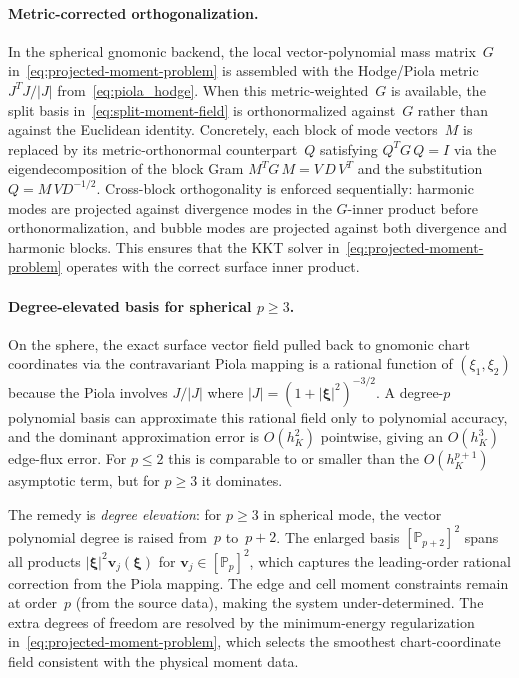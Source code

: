 \documentclass[11pt]{article}
\begin{document}
\paragraph{Metric-corrected orthogonalization.}
In the spherical gnomonic backend, the local vector-polynomial mass matrix~\(G\)
in~\eqref{eq:projected-moment-problem} is assembled with the Hodge/Piola metric
\(J^T\!J / |J|\) from~\eqref{eq:piola_hodge}.  When this
metric-weighted~\(G\) is available, the split basis
in~\eqref{eq:split-moment-field} is orthonormalized against~\(G\) rather than
against the Euclidean identity.  Concretely, each block of mode vectors~\(M\) is
replaced by its metric-orthonormal counterpart~\(Q\) satisfying \(Q^T G\, Q =
I\) via the eigendecomposition of the block Gram \(M^T G\, M = V\, D\, V^T\) and
the substitution \(Q = M\, V D^{-1/2}\).  Cross-block orthogonality is enforced
sequentially: harmonic modes are projected against divergence modes in the
\(G\)-inner product before orthonormalization, and bubble modes are projected
against both divergence and harmonic blocks.  This ensures that the KKT
solver in~\eqref{eq:projected-moment-problem} operates with the correct surface
inner product.

\paragraph{Degree-elevated basis for spherical \(p\ge3\).}
On the sphere, the exact surface vector field pulled back to gnomonic chart
coordinates via the contravariant Piola mapping is a rational function of
\((\xi_1,\xi_2)\) because the Piola involves \(J/|J|\) where
\(|J|=(1+|\boldsymbol{\xi}|^2)^{-3/2}\).  A degree-\(p\) polynomial basis can
approximate this rational field only to polynomial accuracy, and the dominant
approximation error is \(O(h_K^2)\) pointwise, giving an \(O(h_K^3)\) edge-flux
error.  For \(p\le 2\) this is comparable to or smaller than the \(O(h_K^{p+1})\)
asymptotic term, but for \(p\ge 3\) it dominates.

The remedy is \emph{degree elevation}: for \(p\ge3\) in spherical mode, the
vector polynomial degree is raised from~\(p\) to~\(p+2\).  The enlarged basis
\([\mathbb{P}_{p+2}]^2\) spans all products
\(|\boldsymbol{\xi}|^2 \boldsymbol{v}_j(\boldsymbol{\xi})\) for
\(\boldsymbol{v}_j\in[\mathbb{P}_p]^2\), which captures the leading-order
rational correction from the Piola mapping.  The edge and cell moment constraints
remain at order~\(p\) (from the source data), making the system under-determined.
The extra degrees of freedom are resolved by the minimum-energy regularization
in~\eqref{eq:projected-moment-problem}, which selects the smoothest
chart-coordinate field consistent with the physical moment data.
\end{document}
